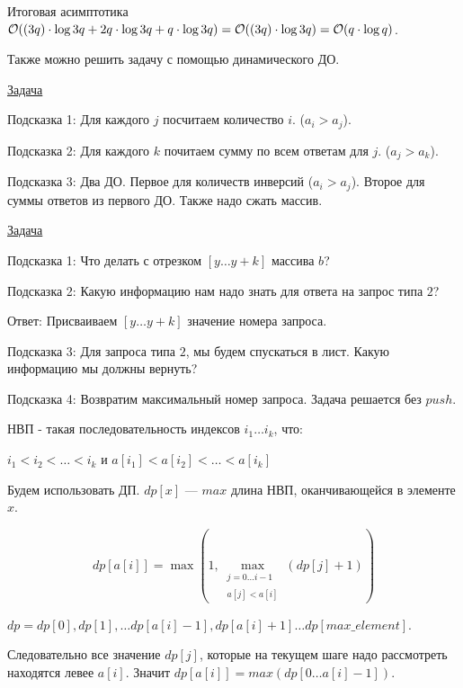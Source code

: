 Итоговая асимптотика $\mathcal{O}((3q) \cdot \log 3q + 2q \cdot \log 3q + q \cdot \log 3q) = \mathcal{O}((3q) \cdot \log 3q) = \mathcal{O}(q \cdot \log q)$.

Также можно решить задачу с помощью динамического ДО.


\href{https://codeforces.com/contest/61/problem/E}{Задача} \href{https://codeforces.com/contest/61/submission/124484488}{}

Подсказка 1: Для каждого $j$ посчитаем количество $i$. ($a_i > a_j$).

Подсказка 2: Для каждого $k$ почитаем сумму по всем ответам для $j$. ($a_j > a_k$).

Подсказка 3: Два ДО. Первое для количеств инверсий ($a_i > a_j$). Второе для суммы ответов из первого ДО. Также надо сжать массив.


\href{https://codeforces.com/contest/292/problem/E}{Задача}
\href{https://codeforces.com/contest/292/submission/124450504}{}

Подсказка 1: Что делать с отрезком $[y \dots y + k]$ массива $b$?

Подсказка 2: Какую информацию нам надо знать для ответа на запрос типа $2$?

Ответ: Присваиваем $[y \dots y + k]$ значение номера запроса.

Подсказка 3: Для запроса типа $2$, мы будем спускаться в лист. Какую информацию мы должны вернуть?

Подсказка 4: Возвратим максимальный номер запроса. Задача решается без $push$.


НВП - такая последовательность индексов $i_1 \ldots i_k$, что: 

$i_1 < i_2 < \dots < i_k$ и $a[i_1] < a[i_2] < \dots < a[i_k]$

\down

Будем использовать ДП. $dp[x]$ --- $max$ длина НВП, оканчивающейся в элементе $x$.

$$dp[a[i]] = \max\left(1, \max_{\substack{j = 0 \dots i-1 \\\\ a[j] < a[i]}} \left(dp[j] + 1\right)\right)$$

$dp = {dp[0], dp[1], \ldots dp[a[i] - 1], dp[a[i] + 1] \ldots dp[max\_element]}$.

Следовательно все значение $dp[j]$, которые на текущем шаге надо рассмотреть находятся левее $a[i]$. Значит $dp[a[i]] = max(dp[0 \ldots a[i] - 1])$.

